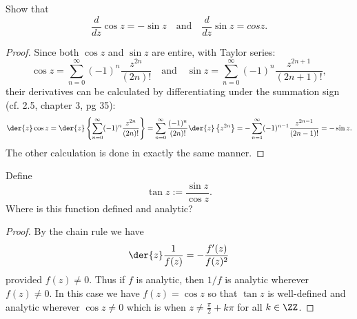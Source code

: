 \begin{exer}{4}
Show that $$\frac{d}{dz}\cos z = -\sin z \quad\text{and}\quad \frac{d}{dz}\sin z=cos z.$$
\end{exer}

\begin{proof}
Since both $\cos z$ and $\sin z$ are entire, with Taylor series:
\[
	\cos z=\sum_{n=0}^{\infty} (-1)^n\frac{z^{2n}}{(2n)!} \quad\text{and}\quad %
	\sin z=\sum_{n=0}^{\infty} (-1)^n\frac{z^{2n+1}}{(2n+1)!},
\]
their derivatives can be calculated by differentiating under the summation sign 
(cf. 2.5, chapter 3, pg 35):
\[
	\der{z}\cos z=\der{z}\left\{ \sum_{n=0}^{\infty} (-1)^n\frac{z^{2n}}{(2n)!}\right\}= %
	\sum_{n=0}^{\infty}\frac{(-1)^n}{(2n)!}\der{z}\left\{z^{2n}\right\}= %
	-\sum_{n=1}^{\infty}(-1)^{n-1}\frac{z^{2n-1}}{(2n-1)!}= %
	-\sin z.
\]
The other calculation is done in exactly the same manner.
\end{proof}

\HRule

\begin{exer}{8}
Define $$\tan z:=\frac{\sin z}{\cos z}.$$ Where is this function defined and analytic?
\end{exer}
\begin{proof}
By the chain rule we have
\[
	\der{z}\frac{1}{f(z)}=-\frac{f'(z)}{f(z)^2}
\]
provided $f(z)\neq 0$. Thus if $f$ is analytic, then $1/f$ is analytic wherever $f(z)\neq0$.
In this case we have $f(z)=\cos z$ so that $\tan z$ is well-defined and analytic wherever
$\cos z\neq0$ which is when $z\neq \tfrac{\pi}{2}+k\pi$ for all $k\in\ZZ$.
\end{proof}

\HRule


